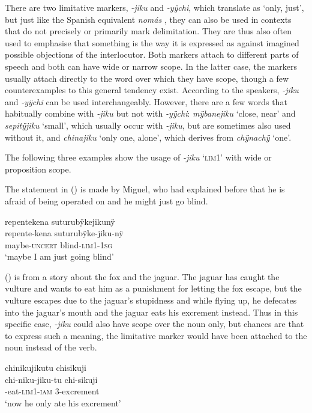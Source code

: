 There are two limitative markers, \textit{-jiku} and \textit{-yÿchi}, which translate as ‘only, just’, but just like the Spanish equivalent \textit{nomás} \citep[cf.][45--46]{Mendoza2015}, they can also be used in contexts that do not precisely or primarily mark delimitation. They are thus also often used to emphasise that something is the way it is expressed as against imagined possible objections of the interlocutor. Both markers attach to different parts of speech and both can have wide or narrow scope. In the latter case, the markers usually attach directly to the word over which they have scope, though a few counterexamples to this general tendency exist. According to the speakers,  \textit{-jiku} and \textit{-yÿchi} can be used interchangeably. However, there are a few words that habitually combine with \textit{-jiku} but not with \textit{-yÿchi}: \textit{mÿbanejiku} ‘close, near’ and \textit{sepitÿjiku} ‘small’, which usually occur with \textit{-jiku}, but are sometimes also used without it, and \textit{chinajiku} ‘only one, alone’, which derives from \textit{chÿnachÿ} ‘one’.

The following three examples show the usage of \textit{-jiku} ‘\textsc{lim}1’ with wide or proposition scope. 

The statement in () is made by Miguel, who had explained before that he is afraid of being operated on and he might just go blind.

\ea\label{ex:jiku-2}
\begingl
\glpreamble repentekena suturubÿkejikunÿ\\
\gla repente-kena suturubÿke-jiku-nÿ\\
\glb maybe-\textsc{uncert} blind-\textsc{lim}1-1\textsc{sg}\\
\glft ‘maybe I am just going blind’
\endgl
\trailingcitation{[mqx-p110826l.300]}
\xe

() is from a story about the fox and the jaguar. The jaguar has caught the vulture and wants to eat him as a punishment for letting the fox escape, but the vulture escapes due to the jaguar's stupidness and while flying up, he defecates into the jaguar’s mouth and the jaguar eats his excrement instead. Thus in this specific case, \textit{-jiku} could also have scope over the noun only, but chances are that to express such a meaning, the limitative marker would have been attached to the noun instead of the verb.

\ea\label{ex:jiku-1}
\begingl
\glpreamble chinikujikutu chisikuji\\
\gla chi-niku-jiku-tu chi-sikuji\\
-eat-\textsc{lim}1-\textsc{iam} 3-excrement\\
\glft ‘now he only ate his excrement’
\endgl
\trailingcitation{[jmx-n120429ls-x5.213]}
\xe


